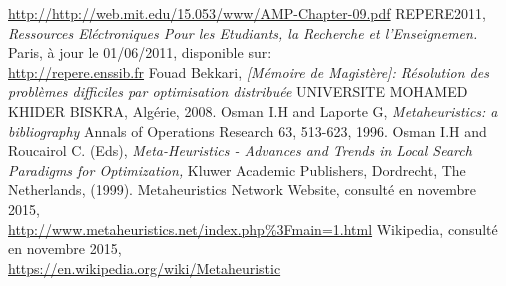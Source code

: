 \documentclass[a4paper,11pt,oneside]{report}
\theoremstyle{plain}
\newcommand{\0}{/ \! \! \! 0}
\theoremstyle{plain}
\begin{document}
\begin{thebibliography}{10}
\url{http://http://web.mit.edu/15.053/www/AMP-Chapter-09.pdf}
REPERE2011,\\
\emph{Ressources El\'ectroniques Pour les Etudiants, la Recherche et l'Enseignemen.}\\
Paris, \`a jour le 01/06/2011, disponible sur:\\
\url{http://repere.enssib.fr}
Fouad Bekkari,
\emph{[M\'emoire de Magist\`ere]: R\'esolution des probl\`emes difficiles par optimisation distribu\'ee}
UNIVERSITE MOHAMED KHIDER BISKRA, Alg\'erie, 2008.
Osman I.H and Laporte G,
\emph{Metaheuristics: a bibliography}
Annals of Operations Research 63, 513-623, 1996.
Osman I.H and Roucairol C. (Eds),
\emph{Meta-Heuristics - Advances and Trends in Local Search Paradigms for Optimization,}
 Kluwer Academic Publishers, Dordrecht, The Netherlands, (1999).
Metaheuristics Network Website, consult\'e en novembre 2015,\\
\url{http://www.metaheuristics.net/index.php\%3Fmain=1.html}
Wikipedia, consult\'e en novembre 2015,\\
\url{https://en.wikipedia.org/wiki/Metaheuristic}
\end{thebibliography}
\end{document}
